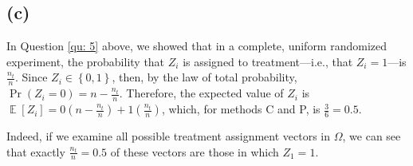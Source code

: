 \documentclass[11pt]{article}\usepackage[]{graphicx}\usepackage[]{color}
\theoremstyle{newstyle}
\DeclareMathOperator{\E}{\mathbb{E}}
\begin{document}
\subsection{(c)}

In Question \ref{qu: 5} above, we showed that in a complete, uniform randomized experiment, the probability that $Z_i$ is assigned to treatment---i.e., that $Z_i = 1$---is $\frac{n_t}{n}$. Since $Z_i \in \left\{0, 1\right\}$, then, by the law of total probability, $\Pr\left(Z_i = 0\right) = n - \frac{n_t}{n}$. Therefore, the expected value of $Z_i$ is $\E\left[Z_i\right] = 0\left(n - \frac{n_t}{n}\right) + 1 \left(\frac{n_t}{n}\right)$, which, for methods C and P, is $\frac{3}{6} = 0.5$.

Indeed, if we examine all possible treatment assignment vectors in $\Omega$, we can see that exactly $\frac{n_t}{n} = 0.5$ of these vectors are those in which $Z_1 = 1$.
\end{document}
